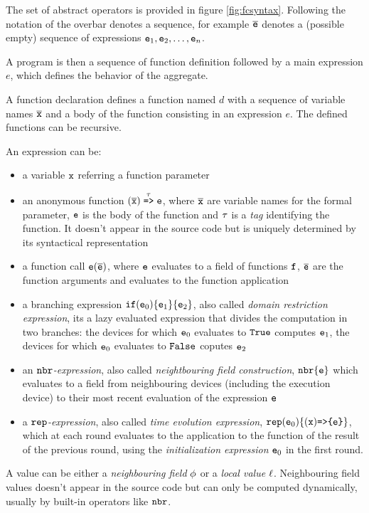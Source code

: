 The set of abstract operators is provided in figure \ref{fig:fcsyntax}. Following the notation of \cite{FeatherJava} the overbar denotes a sequence, for example $\overline{\mathtt{e}}$  denotes a (possible empty) sequence of expressions $\mathtt{e}_1, \mathtt{e}_2, \dots, \mathtt{e}_n$.

A program is then a sequence of function definition followed by a main expression $e$, which defines the behavior of the aggregate. 

A function declaration defines a function named $d$ with a sequence of variable names $\overline{\mathtt{x}}$ and a body of the function consisting in an expression $e$. The defined functions can be recursive.

An expression can be:
\begin{itemize}
\item a variable $\mathtt{x}$ referring a function parameter
\item an anonymous function $ (\overline{\mathtt{x}}) \stackrel{\tau}{\mathrm{\texttt{=>}}} \mathtt{e}$, where $\overline{\mathtt{x}}$ are variable names for the formal parameter, $\mathtt{e}$ is the body of the function and $\tau$ is a \textit{tag} identifying the function. It doesn't appear in the source code but is uniquely determined by its syntactical representation
\item a function call $\mathtt{e}(\overline{\mathtt{e}})$, where $\mathtt{e}$ evaluates to a field of functions $\mathtt{f}$, $\overline{\mathtt{e}}$ are the function arguments and evaluates to the function application
\item a {branching expression} $\mathtt{if} (\mathtt{e}_0) \{\mathtt{e}_1\} \{\mathtt{e}_2\}$, also called  \textit{domain restriction expression}, its a lazy evaluated expression that divides the computation in two branches: the devices for which $\mathtt{e}_0$ evaluates to $\mathtt{True}$ computes $\mathtt{e}_1$, the devices for which $\mathtt{e}_0$ evaluates to $\mathtt{False}$ coputes $\mathtt{e}_2$
\item an \textit{$\mathtt{nbr}$-expression}, also called \textit{neightbouring field construction}, $\mathtt{nbr}\{\mathtt{e}\}$ which evaluates to a field from neighbouring devices (including the execution device) to their most recent evaluation of the expression $\mathtt{e}$
\item a \textit{$\mathtt{rep}$-expression}, also called \textit{time evolution expression}, $\mathtt{rep}(\mathtt{e}_0)\{ (\mathtt{x}) \mathrm{ \texttt{=>\{}\mathtt{e}\texttt{\}} } \}$, which at each round evaluates to the application to the function of the result of the previous round, using the \textit{initialization expression} $\mathtt{e}_0$ in the first round.
\end{itemize}

A value can be either a \textit{neighbouring field} $\phi$ or a \textit{local value} $\ell$. Neighbouring field values doesn't appear in the source code but can only be computed dynamically, usually by built-in operators like $\mathtt{nbr}$.


